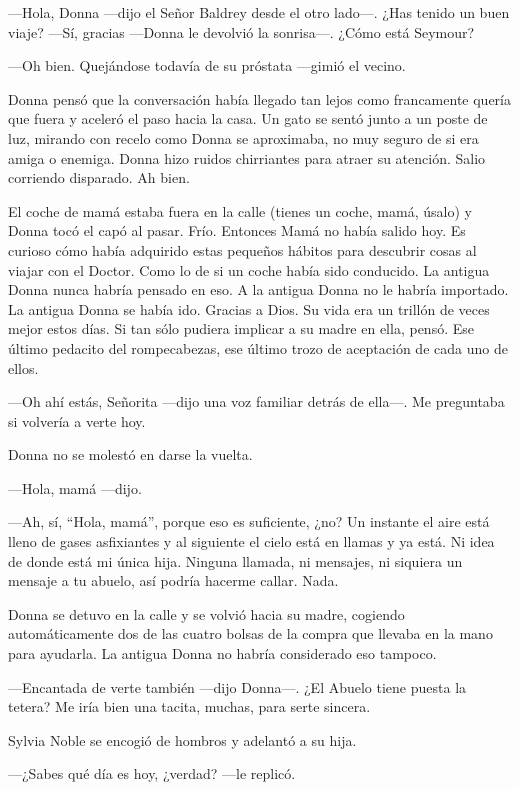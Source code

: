 ---Hola, Donna ---dijo el Señor Baldrey desde el otro lado---. ¿Has
tenido un buen viaje? ---Sí, gracias ---Donna le devolvió la
sonrisa---. ¿Cómo está Seymour?

---Oh bien. Quejándose todavía de su próstata ---gimió el vecino.

Donna pensó que la conversación había llegado tan lejos como francamente
quería que fuera y aceleró el paso hacia la casa. Un gato se sentó junto
a un poste de luz, mirando con recelo como Donna se aproximaba, no muy
seguro de si era amiga o enemiga. Donna hizo ruidos chirriantes para
atraer su atención. Salio corriendo disparado. Ah bien.

El coche de mamá estaba fuera en la calle (tienes un coche, mamá, úsalo)
y Donna tocó el capó al pasar. Frío. Entonces Mamá no había salido hoy.
Es curioso cómo había adquirido estas pequeños hábitos para descubrir
cosas al viajar con el Doctor. Como lo de si un coche había sido
conducido. La antigua Donna nunca habría pensado en eso. A la antigua
Donna no le habría importado. La antigua Donna se había ido. Gracias a
Dios. Su vida era un trillón de veces mejor estos días. Si tan sólo
pudiera implicar a su madre en ella, pensó. Ese último pedacito del
rompecabezas, ese último trozo de aceptación de cada uno de ellos.

---Oh ahí estás, Señorita ---dijo una voz familiar detrás de ella---. Me
preguntaba si volvería a verte hoy.

Donna no se molestó en darse la vuelta.

---Hola, mamá ---dijo.

---Ah, sí, ``Hola, mamá'', porque eso es suficiente, ¿no? Un instante
el aire está lleno de gases asfixiantes y al siguiente el cielo está en
llamas y ya está. Ni idea de donde está mi única hija. Ninguna llamada,
ni mensajes, ni siquiera un mensaje a tu abuelo, así podría hacerme
callar. Nada.

Donna se detuvo en la calle y se volvió hacia su madre, cogiendo
automáticamente dos de las cuatro bolsas de la compra que llevaba en la
mano para ayudarla. La antigua Donna no habría considerado eso tampoco.

---Encantada de verte también ---dijo Donna---. ¿El Abuelo tiene puesta
la tetera? Me iría bien una tacita, muchas, para serte sincera.

Sylvia Noble se encogió de hombros y adelantó a su hija.

---¿Sabes qué día es hoy, ¿verdad? ---le replicó.

